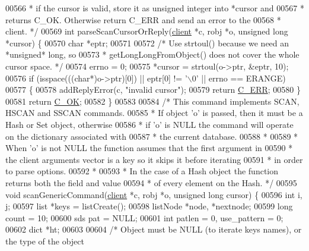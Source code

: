 \begin{DoxyCode}
00566 \textcolor{comment}{ * if the cursor is valid, store it as unsigned integer into *cursor and}
00567 \textcolor{comment}{ * returns C\_OK. Otherwise return C\_ERR and send an error to the}
00568 \textcolor{comment}{ * client. */}
00569 \textcolor{keywordtype}{int} parseScanCursorOrReply(\hyperlink{structclient}{client} *c, robj *o, \textcolor{keywordtype}{unsigned} \textcolor{keywordtype}{long} *cursor) \{
00570     \textcolor{keywordtype}{char} *eptr;
00571 
00572     \textcolor{comment}{/* Use strtoul() because we need an *unsigned* long, so}
00573 \textcolor{comment}{     * getLongLongFromObject() does not cover the whole cursor space. */}
00574     errno = 0;
00575     *cursor = strtoul(o->ptr, &eptr, 10);
00576     \textcolor{keywordflow}{if} (isspace(((\textcolor{keywordtype}{char}*)o->ptr)[0]) || eptr[0] != \textcolor{stringliteral}{'\(\backslash\)0'} || errno == ERANGE)
00577     \{
00578         addReplyError(c, \textcolor{stringliteral}{"invalid cursor"});
00579         \textcolor{keywordflow}{return} \hyperlink{server_8h_af98ac28d5f4d23d7ed5985188e6fb7d1}{C\_ERR};
00580     \}
00581     \textcolor{keywordflow}{return} \hyperlink{server_8h_a303769ef1065076e68731584e758d3e1}{C\_OK};
00582 \}
00583 
00584 \textcolor{comment}{/* This command implements SCAN, HSCAN and SSCAN commands.}
00585 \textcolor{comment}{ * If object 'o' is passed, then it must be a Hash or Set object, otherwise}
00586 \textcolor{comment}{ * if 'o' is NULL the command will operate on the dictionary associated with}
00587 \textcolor{comment}{ * the current database.}
00588 \textcolor{comment}{ *}
00589 \textcolor{comment}{ * When 'o' is not NULL the function assumes that the first argument in}
00590 \textcolor{comment}{ * the client arguments vector is a key so it skips it before iterating}
00591 \textcolor{comment}{ * in order to parse options.}
00592 \textcolor{comment}{ *}
00593 \textcolor{comment}{ * In the case of a Hash object the function returns both the field and value}
00594 \textcolor{comment}{ * of every element on the Hash. */}
00595 \textcolor{keywordtype}{void} scanGenericCommand(\hyperlink{structclient}{client} *c, robj *o, \textcolor{keywordtype}{unsigned} \textcolor{keywordtype}{long} cursor) \{
00596     \textcolor{keywordtype}{int} i, j;
00597     list *keys = listCreate();
00598     listNode *node, *nextnode;
00599     \textcolor{keywordtype}{long} count = 10;
00600     sds pat = NULL;
00601     \textcolor{keywordtype}{int} patlen = 0, use\_pattern = 0;
00602     dict *ht;
00603 
00604     \textcolor{comment}{/* Object must be NULL (to iterate keys names), or the type of the object}

\end{DoxyCode}
